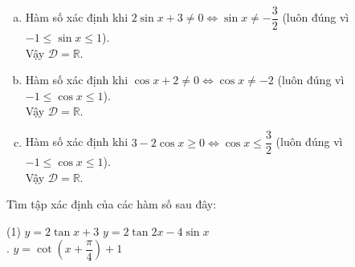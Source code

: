 \begin{vd}
{\begin{enumerate}[a)]
			\item Hàm số xác định khi $2\sin x + 3 \ne 0 \Leftrightarrow \sin x \ne -\dfrac{3}{2}$ (luôn đúng vì $-1 \le \sin x \le 1$).\\
			      Vậy $\mathscr{D} = \mathbb{R}$.

			\item Hàm số xác định khi $\cos x + 2 \ne 0 \Leftrightarrow \cos x \ne -2$ (luôn đúng vì $-1 \le \cos x \le 1$).\\
			      Vậy $\mathscr{D} = \mathbb{R}$.

			\item Hàm số xác định khi $3 - 2\cos x \ge 0 \Leftrightarrow \cos x \le \dfrac{3}{2}$ (luôn đúng vì $-1 \le \cos x \le 1$).\\
			      Vậy $\mathscr{D} = \mathbb{R}$.
		\end{enumerate}
	}
\end{vd} 
\begin{vd}
	Tìm tập xác định của các hàm số sau đây:
	\begin{tasks}(1)
		\task $y=2\tan x+3$ \dotfill
		\task $y=2\tan 2x-4\sin x$\dotfill\\
		.\dotfill
		\task $y=\cot \left(x+\dfrac{\pi}{4} \right)+1$ \dotfill
	\end{tasks}
\end{vd} 

